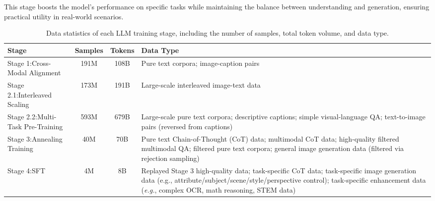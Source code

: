 \documentclass[11pt, a4paper, logo, copyright]{googledeepmind}
\begin{document}
This stage boosts the model’s performance on specific tasks while maintaining the balance between understanding and generation, ensuring practical utility in real-world scenarios.

\begin{table}[t!]
\centering
\footnotesize %
\renewcommand{\arraystretch}{1.4} %
\setlength{\tabcolsep}{2pt} %
\begin{tabular}{p{4cm}ccp{9cm}} %
\toprule
Stage & Samples & Tokens & Data Type \\
\midrule
Stage 1:\newline Cross-Modal Alignment & 191M & 108B & Pure text corpora; \newline image-caption pairs  %
\\
\midrule
Stage 2.1:\newline Interleaved Scaling & 173M & 191B & %
Large-scale interleaved image-text data \\
Stage 2.2:\newline Multi-Task Pre-Training & 593M & 679B & Large-scale pure text corpora; \newline descriptive captions; simple visual-language QA; \newline text-to-image pairs (reversed from captions) \\
\midrule
Stage 3:\newline Annealing Training & 40M & 70B & Pure text Chain-of-Thought (CoT) data; \newline multimodal CoT data; high-quality filtered multimodal QA; \newline filtered pure text corpora; general image generation data (filtered via rejection sampling) \\
\midrule
Stage 4:\newline SFT & 4M & 8B & Replayed Stage 3 high-quality data; \newline task-specific CoT data; task-specific image generation data (e.g., attribute/subject/scene/style/perspective control); \newline task-specific enhancement data (\textit{e.g.}, complex OCR, math reasoning, STEM data) \\
\bottomrule
\end{tabular}
\caption{Data statistics of each LLM training stage, including the number of samples, total token volume, and data type.}
\label{tab:ar_training_data}
\end{table}
\end{document}
